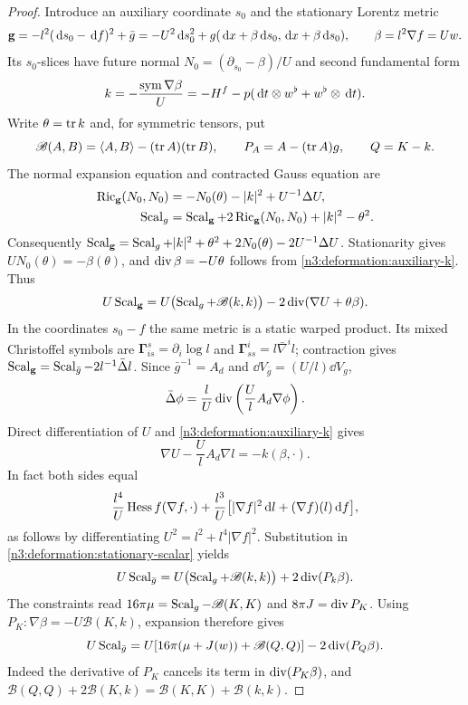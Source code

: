 \begin{proof}
Introduce an auxiliary coordinate $s_0$ and the stationary Lorentz metric
\[
 {\bf g}=-l^2(\,\mathrm d s_0-\,\mathrm d f)^2+\bar g
       =-U^2\,\mathrm d s_0^2+g(\,\mathrm d x+\beta\,\mathrm d s_0,\,\mathrm d x+\beta\,\mathrm d s_0),
 \qquad \beta=l^2\nabla f=Uw.
\]
Its $s_0$-slices have future normal $N_0=(\partial_{s_0}-\beta)/U$ and
second fundamental form
\begin{equation}\label{n3:deformation:auxiliary-k}
 k=-\frac{\operatorname{sym}\nabla\beta}{U}
   =-H^f-p(\,\mathrm d t\otimes w^\flat+w^\flat\otimes\,\mathrm d t).
\end{equation}
Write $\theta=\operatorname{tr} k$ and, for symmetric tensors, put
\[
 \mathscr B(A,B)=\langle A,B\rangle-(\operatorname{tr} A)(\operatorname{tr} B),\qquad
 P_A=A-(\operatorname{tr} A)g,\qquad Q=K-k.
\]
The normal expansion equation and contracted Gauss equation are
\[
 \begin{split}
 \operatorname{Ric}_{\bf g}(N_0,N_0)&=-N_0(\theta)-|k|^2+U^{-1}\Delta U,\\
 \operatorname{Scal}_g&=\operatorname{Scal}_{\bf g}+2\operatorname{Ric}_{\bf g}(N_0,N_0)+|k|^2-\theta^2.
 \end{split}
\]
Consequently
$\operatorname{Scal}_{\bf g}=\operatorname{Scal}_g+|k|^2+\theta^2+
2N_0(\theta)-2U^{-1}\Delta U$.
Stationarity gives $UN_0(\theta)=-\beta(\theta)$, and
$\operatorname{div}\beta=-U\theta$ follows from \eqref{n3:deformation:auxiliary-k}.
Thus
\begin{equation}\label{n3:deformation:stationary-scalar}
 U\operatorname{Scal}_{\bf g}
 =U\bigl(\operatorname{Scal}_g+\mathscr B(k,k)\bigr)
   -2\operatorname{div}(\nabla U+\theta\beta).
\end{equation}
In the coordinates $s_0-f$ the same metric is a static warped product.
Its mixed Christoffel symbols are
$\mathbf{\Gamma}^{s}_{is}=\partial_i\log l$ and
$\mathbf{\Gamma}^{i}_{ss}=l\bar\nabla^il$; contraction gives
$\operatorname{Scal}_{\bf g}=\operatorname{Scal}_{\bar g}-2l^{-1}\bar\Delta l$.
Since $\bar g^{-1}=A_d$ and $\dd V_{\bar g}=(U/l)\dd V_g$,
\begin{equation}\label{n3:deformation:bar-laplacian}
 \bar\Delta\phi=\frac lU\operatorname{div}\left(\frac Ul A_d\nabla\phi\right).
\end{equation}
Direct differentiation of $U$ and \eqref{n3:deformation:auxiliary-k} gives
\[
 \nabla U-\frac Ul A_d\nabla l=-k(\beta,\cdot).
\]
In fact both sides equal
\[
 \frac{l^4}{U}\operatorname{Hess} f(\nabla f,\cdot)
 +\frac{l^3}{U}\bigl[|\nabla f|^2\,\mathrm d l
                       +(\nabla f)(l)\,\mathrm d f\bigr],
\]
as follows by differentiating $U^2=l^2+l^4|\nabla f|^2$.
Substitution in \eqref{n3:deformation:stationary-scalar} yields
\[
 U\operatorname{Scal}_{\bar g}
 =U\bigl(\operatorname{Scal}_g+\mathscr B(k,k)\bigr)+2\operatorname{div}(P_k\beta).
\]
The constraints read
$16\pi\mu=\operatorname{Scal}_g-\mathscr B(K,K)$ and $8\pi J=\operatorname{div} P_K$.
Using $P_K:\nabla\beta=-U\mathscr B(K,k)$, expansion therefore gives
\begin{equation}\label{n3:deformation:unweighted-identity}
 U\operatorname{Scal}_{\bar g}
 =U[16\pi(\mu+J(w))+\mathscr B(Q,Q)]-2\operatorname{div}(P_Q\beta).
\end{equation}
Indeed the derivative of $P_K$ cancels its term in $\operatorname{div}(P_K\beta)$,
and
$\mathscr B(Q,Q)+2\mathscr B(K,k)=\mathscr B(K,K)+\mathscr B(k,k)$.


\end{proof}
